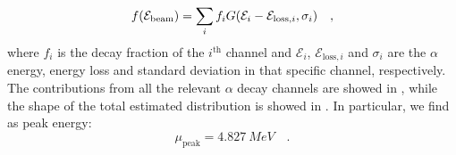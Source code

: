\documentclass[../../main/main.tex]{subfiles}
\begin{document}
\begin{equation}
    f\qty(\mathcal{E}_{\mathrm{beam}})
    =
    \sum_{i} f_{i} G(\mathcal{E}_{i} - \mathcal{E}_{\mathrm{loss},i}, \sigma_i)
    \quad ,
\end{equation}
where \( f_{i} \) is the decay fraction of the \( i^{\mathrm{th}} \) channel and \( \mathcal{E}_{i} \), \( \mathcal{E}_{\mathrm{loss},i} \) and \( \sigma_{i} \) are the \( \alpha \) energy, energy loss and standard deviation in that specific channel, respectively. The contributions from all the relevant \( \alpha \) decay channels are showed in , while the shape of the total estimated distribution is showed in . In particular, we find as peak energy:
\begin{equation}
    \mu_{\mathrm{peak}}
    =
    4.827 \ \si{MeV}
    \quad .
    \label{eq:preliminary_source_straggling_peak}
\end{equation}
\end{document}
